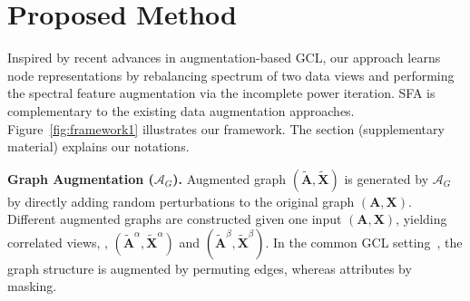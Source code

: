 








\section{Proposed Method}
Inspired by recent advances in %
augmentation-based GCL, our approach learns node representations by rebalancing spectrum of two data views and performing the spectral feature augmentation via the incomplete power iteration. SFA is complementary to the existing data augmentation approaches.  Figure~\ref{fig:framework1} illustrates our framework. The  section (supplementary material) explains our notations.

\vspace{0.1cm}
\noindent\textbf{Graph Augmentation ($\mathcal{A}_G$).}  
Augmented graph $(\tilde{\mathbf{A}}, \tilde{\mathbf{X}})$ is generated by $\mathcal{A}_G$ by directly adding random perturbations to the original graph $({\mathbf{A}}, {\mathbf{X}})$.
%
Different augmented graphs are constructed given one input $(\mathbf {A}, \mathbf {X})$, yielding correlated views,  \ie, $(\widetilde{\mathbf{A}}^\alpha, \widetilde{\mathbf{X}}^\alpha)$ and $(\widetilde{\mathbf{A}}^\beta, \widetilde{\mathbf{X}}^\beta)$.
%
In the common GCL setting~\cite{zhu2020deep}, the graph structure is augmented by  permuting edges, whereas attributes by masking.

